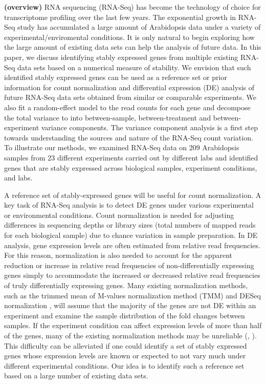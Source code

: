 \documentclass[11pt, a4paper]{article}
\begin{document}
\textbf{(overview)}
RNA sequencing (RNA-Seq) has become the technology of choice for transcriptome
profiling over the last few years. The exponential growth in RNA-Seq study has
accumulated a large amount of Arabidopsis data under a variety of
experimental/enviromental conditions.  It is only natural to begin exploring
how the large amount of existing data sets can help the analysis of future
data.  In this paper, we discuss identifying stably expressed genes from
multiple existing RNA-Seq data sets based on a numerical measure of stability.
We envision that such identified stably expressed genes can be used as a
reference set or prior information for count normalization and differential
expression (DE) analysis of future RNA-Seq data sets obtained from similar or
comparable experiments.  We also fit a random-effect model to the read counts
for each gene and decompose the total variance to into between-sample,
between-treatment and between-experiment variance components. The variance component
analysis is a first step towards understanding the sources and nature of the
RNA-Seq count variation.  To illustrate our methods, we examined RNA-Seq data
on 209 Arabidopsis  samples from 23 different experiments carried out by
different labs and identified genes that are stably expressed across
biological samples, experiment conditions, and labs.  

A reference set of stably-expressed genes will be useful for count
normalization.  A key task of RNA-Seq analysis is to detect DE genes under
various experimental or environmental conditions. Count normalization is
needed for adjusting differences in sequencing depths or library sizes (total
numbers of mapped reads for each biological sample) due to chance variation in
sample preparation.  In DE analysis, gene expression levels are often
estimated from relative read frequencies. For this reason, normalization is
also needed to account for the apparent reduction or increase in relative read
frequencies of non-differentially expressing genes simply to accommodate the
increased or decreased relative read frequencies of truly differentially
expressing genes.  Many existing normalization methods, such as the trimmed
mean of M-values normalization method (TMM) \citep{robinson2010scaling} and
DESeq normalization \citep{anders2010differential}, will  assume that the
majority of the genes are not DE within an experiment and examine the sample
distribution of the fold changes between samples.
If the experiment condition can affect expression levels of more than half of
the genes, many of the existing normalization methods may be unreliable
(\cite{loven2012revisiting}, \cite{wu2013use}).  This difficulty can be
alleviated if one could identify a set of stably expressed genes whose
expression levels are known or expected to not vary much under different
experimental conditions. Our idea is to identify such a reference set based on
a large number of existing data sets.
\end{document}
